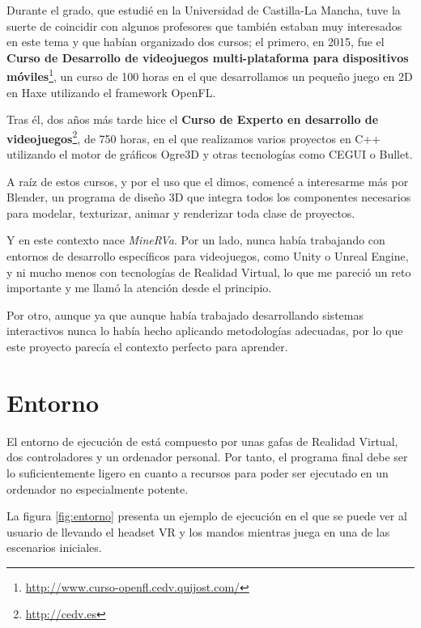 Durante el grado, que estudié en la Universidad de Castilla-La Mancha, tuve la suerte de coincidir con algunos profesores que también estaban muy interesados en este tema y que habían organizado dos cursos; el primero, en 2015, fue el \textbf{Curso de Desarrollo de videojuegos multi-plataforma para dispositivos móviles}\footnote{\url{http://www.curso-openfl.cedv.quijost.com/}}, un curso de 100 horas en el que desarrollamos un pequeño juego en 2D en Haxe utilizando el framework OpenFL.

Tras él, dos años más tarde hice el \textbf{Curso de Experto en desarrollo de videojuegos}\footnote{\url{http://cedv.es}}, de 750 horas, en el que realizamos varios proyectos en C++ utilizando el motor de gráficos Ogre3D y otras tecnologías como CEGUI o Bullet.

A raíz de estos cursos, y por el uso que el dimos, comencé a interesarme más por Blender, un programa de diseño 3D que integra todos los componentes necesarios para modelar, texturizar, animar y renderizar toda clase de proyectos.

Y en este contexto nace \textit{MineRVa}. Por un lado, nunca había trabajando con entornos de desarrollo específicos para videojuegos, como Unity o Unreal Engine, y ni mucho menos con tecnologías de Realidad Virtual, lo que me pareció un reto importante y me llamó la atención desde el principio.

Por otro, aunque ya que aunque había trabajado desarrollando sistemas interactivos nunca lo había hecho aplicando metodologías adecuadas, por lo que este proyecto parecía el contexto perfecto para aprender.

\section{Entorno}

El entorno de ejecución de \MineRVa está compuesto por unas gafas de Realidad Virtual, dos controladores y un ordenador personal. Por tanto, el programa final debe ser lo suficientemente ligero en cuanto a recursos para poder ser ejecutado en un ordenador no especialmente potente.

La figura \ref{fig:entorno} presenta un ejemplo de ejecución en el que se puede ver al usuario de \MineRVa llevando el headset \acs{VR} y los mandos mientras juega en una de las escenarios iniciales.

\vspace{0.4cm}

